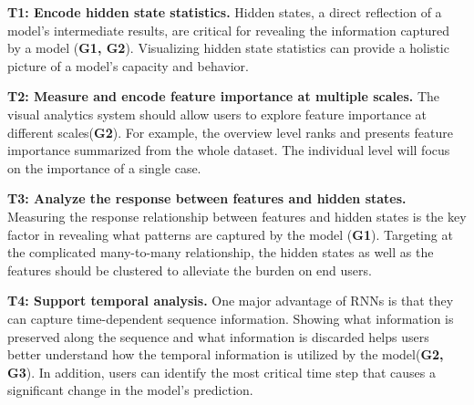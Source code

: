 \textbf{T1: Encode hidden state statistics.}
Hidden states, a direct reflection of a model's intermediate results, are critical for revealing the information captured by a model (\textbf{G1, G2}).
Visualizing hidden state statistics can provide a holistic picture of a model's capacity and behavior.

\textbf{T2: Measure and encode feature importance at multiple scales.}
The visual analytics system should allow users to explore feature importance at different scales(\textbf{G2}). 
For example, the overview level ranks and presents feature importance summarized from the whole dataset. The individual level will focus on the importance of a single case.


\textbf{T3: Analyze the response between features and hidden states.}
Measuring the response relationship between features and hidden states is the key factor in revealing what patterns are captured by the model (\textbf{G1}). 
Targeting at the complicated many-to-many relationship, the hidden states as well as the features should be clustered to alleviate the burden on end users. 


\textbf{T4: Support temporal analysis.}
One major advantage of RNNs is that they can capture time-dependent sequence information.
Showing what information is preserved along the sequence and what information is discarded helps users better understand how the temporal information is utilized by the model(\textbf{G2, G3}).
In addition, users can identify the most critical time step that causes a significant change in the model's prediction.

